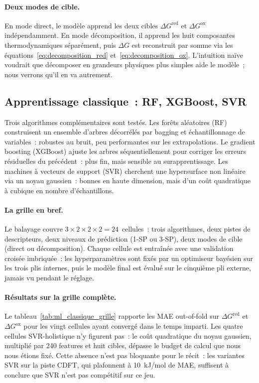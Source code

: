 \paragraph{Deux modes de cible.}
En mode direct, le modèle apprend les deux cibles $\Delta G^\text{red}$ et $\Delta G^\text{ox}$ indépendamment. En mode décomposition, il apprend les huit composantes thermodynamiques séparément, puis $\Delta G$ est reconstruit par somme via les équations~\ref{eq:decomposition_red} et~\ref{eq:decomposition_ox}. L'intuition naïve voudrait que décomposer en grandeurs physiques plus simples aide le modèle~; nous verrons qu'il en va autrement.

\subsection{Apprentissage classique~: RF, XGBoost, SVR}
\label{sec:ml_classique}

Trois algorithmes complémentaires sont testés. Les forêts aléatoires (RF) construisent un ensemble d'arbres décorrélés par bagging et échantillonnage de variables~: robustes au bruit, peu performantes sur les extrapolations. Le gradient boosting (XGBoost) ajuste les arbres séquentiellement pour corriger les erreurs résiduelles du précédent~: plus fin, mais sensible au surapprentissage. Les machines à vecteurs de support (SVR) cherchent une hypersurface non linéaire via un noyau gaussien~: bonnes en haute dimension, mais d'un coût quadratique à cubique en nombre d'échantillons.

\paragraph{La grille en bref.}
Le balayage couvre $3 \times 2 \times 2 \times 2 = 24$~cellules~: trois algorithmes, deux pistes de descripteurs, deux niveaux de prédiction (1-SP ou 3-SP), deux modes de cible (direct ou décomposition). Chaque cellule est entraînée avec une validation croisée imbriquée~: les hyperparamètres sont fixés par un optimiseur bayésien sur les trois plis internes, puis le modèle final est évalué sur le cinquième pli externe, jamais vu pendant le réglage.

\paragraph{Résultats sur la grille complète.}
Le tableau~\ref{tab:ml_classique_grille} rapporte les MAE out-of-fold sur $\Delta G^\text{red}$ et $\Delta G^\text{ox}$ pour les vingt cellules ayant convergé dans le temps imparti. Les quatre cellules SVR-holistique n'y figurent pas~: le coût quadratique du noyau gaussien, multiplié par 240 features et huit cibles, dépasse le budget de calcul que nous nous étions fixé. Cette absence n'est pas bloquante pour le récit~: les variantes SVR sur la piste CDFT, qui plafonnent à \SI{10}{kJ/mol} de MAE, suffisent à conclure que SVR n'est pas compétitif sur ce jeu.

